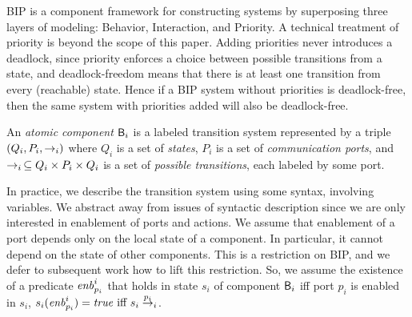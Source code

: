 
BIP is a component framework for constructing systems by superposing three layers of modeling: Behavior, Interaction,
and Priority.
%
A technical treatment of priority is beyond the scope of this paper. Adding priorities never introduces a deadlock,
since priority enforces a choice between possible transitions from a state, and deadlock-freedom means that there is at
least one transition from every (reachable) state.  Hence if a BIP system without priorities is deadlock-free, then the
same system with priorities added will also be deadlock-free.

\begin{definition}
An  {\em atomic component} $\B_i$ is a labeled transition system represented by a triple
$(Q_i, P_i, \goesto_i)$ where $Q_i$ is a set of {\em states}, $P_i$ is a set of {\em communication ports}, and
$\goesto_i\, \subseteq Q_i \times P_i \times Q_i$ is a set of {\em possible transitions}, each labeled by some port.
\end{definition}


In practice, we describe the transition system using some syntax, \eg involving variables.  We abstract away from issues
of syntactic description since we are only interested in enablement of ports and actions. We assume that enablement of a
port depends only on the local state of a component. In particular, it cannot depend on the state of other
components. This is a restriction on BIP, and we defer to subsequent work how to lift this restriction.  So, we assume
the existence of a predicate $\gd{p_i}{i}$ that holds in state $s_i$ of component $\B_i$ iff port $p_i$ is enabled in
$s_i$, \ie $s_i(\gd{p_i}{i}) = \true \mbox{ iff } s_i \goesto[p_i]_i$.

